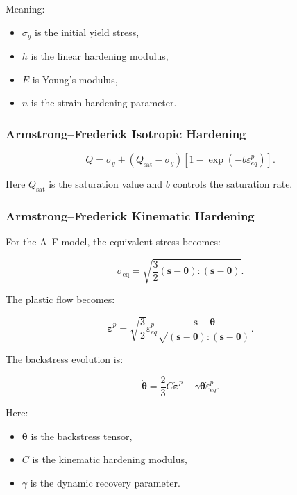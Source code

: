 \documentclass[11pt,a4paper]{article}
\begin{document}
Meaning:

\begin{itemize}
    \item $\sigma_y$ is the initial yield stress,
    \item $h$ is the linear hardening modulus,
    \item $E$ is Young's modulus,
    \item $n$ is the strain hardening parameter.
\end{itemize}

\subsubsection{Armstrong--Frederick Isotropic Hardening}

\begin{equation}
Q =
\sigma_y
+
(Q_{\text{sat}}-\sigma_y)
\left[
1-\exp(-b\varepsilon_{eq}^p)
\right].
\end{equation}

Here $Q_{\text{sat}}$ is the saturation value and $b$ controls the saturation rate.

\subsubsection{Armstrong--Frederick Kinematic Hardening}

For the A--F model, the equivalent stress becomes:

\begin{equation}
\sigma_{\text{eq}}
=
\sqrt{
\frac{3}{2}
(\bm{s}-\bm{\theta}):(\bm{s}-\bm{\theta})
}.
\end{equation}

The plastic flow becomes:

\begin{equation}
\dot{\bm{\varepsilon}}^p
=
\sqrt{\frac{3}{2}}
\dot{\varepsilon}_{eq}^p
\frac{\bm{s}-\bm{\theta}}
{\sqrt{(\bm{s}-\bm{\theta}):(\bm{s}-\bm{\theta})}} .
\end{equation}

The backstress evolution is:

\begin{equation}
\dot{\bm{\theta}}
=
\frac{2}{3}C\dot{\bm{\varepsilon}}^p
-
\gamma \bm{\theta}\dot{\varepsilon}_{eq}^p .
\end{equation}

Here:

\begin{itemize}
    \item $\bm{\theta}$ is the backstress tensor,
    \item $C$ is the kinematic hardening modulus,
    \item $\gamma$ is the dynamic recovery parameter.
\end{itemize}
\end{document}
